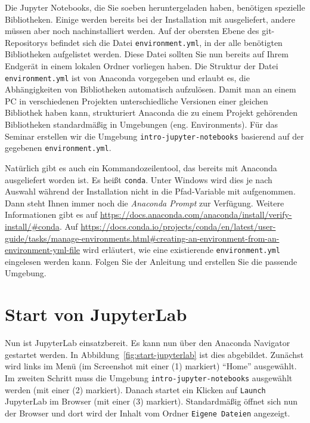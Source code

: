 \documentclass{tufte-handout}
\begin{document}
Die Jupyter Notebooks, die Sie soeben heruntergeladen haben, benötigen  spezielle Bibliotheken.
Einige werden bereits bei der Installation mit ausgeliefert, andere müssen aber noch nachinstalliert werden.
Auf der obersten Ebene des git-Repositorys befindet sich die Datei \texttt{environment.yml}, in der alle benötigten Bibliotheken aufgelistet werden.
Diese Datei sollten Sie nun bereits auf Ihrem Endgerät in einem lokalen Ordner vorliegen haben.
Die Struktur der Datei \texttt{environment.yml} ist von Anaconda vorgegeben und erlaubt es, die Abhängigkeiten von Bibliotheken automatisch aufzulösen.
Damit man an einem PC in verschiedenen Projekten unterschiedliche Versionen einer gleichen Bibliothek haben kann,
strukturiert Anaconda die zu einem Projekt gehörenden Bibliotheken standardmäßig in Umgebungen (eng. Environments).
Für das Seminar erstellen wir die Umgebung \texttt{intro-jupyter-notebooks} basierend auf der gegebenen \texttt{environment.yml}.

Natürlich gibt es auch ein Kommandozeilentool, das bereits mit Anaconda ausgeliefert worden ist.
Es heißt \texttt{conda}.
Unter Windows wird dies je nach Auswahl während der Installation nicht in die Pfad-Variable mit aufgenommen.
Dann steht Ihnen immer noch die \emph{Anaconda Prompt} zur Verfügung.
Weitere Informationen gibt es auf
\url{https://docs.anaconda.com/anaconda/install/verify-install/#conda}.
Auf
\url{https://docs.conda.io/projects/conda/en/latest/user-guide/tasks/manage-environments.html#creating-an-environment-from-an-environment-yml-file}
wird erläutert, wie eine existierende \texttt{environment.yml} eingelesen werden kann.
Folgen Sie der Anleitung und erstellen Sie die passende Umgebung.

\section{Start von JupyterLab}

Nun ist JupyterLab einsatzbereit.
Es kann nun über den Anaconda Navigator gestartet werden.
In Abbildung~\ref{fig:start-jupyterlab} ist dies abgebildet.
Zunächst wird links im Menü
(im Screenshot mit einer (1) markiert)
\enquote{Home} ausgewählt.
Im zweiten Schritt muss die Umgebung \texttt{intro-jupyter-notebooks} ausgewählt werden
(mit einer (2) markiert).
Danach startet ein Klicken auf \texttt{Launch} JupyterLab im Browser
(mit einer (3) markiert).
Standardmäßig öffnet sich nun der Browser und dort wird der Inhalt vom Ordner \texttt{Eigene Dateien} angezeigt.
\end{document}
